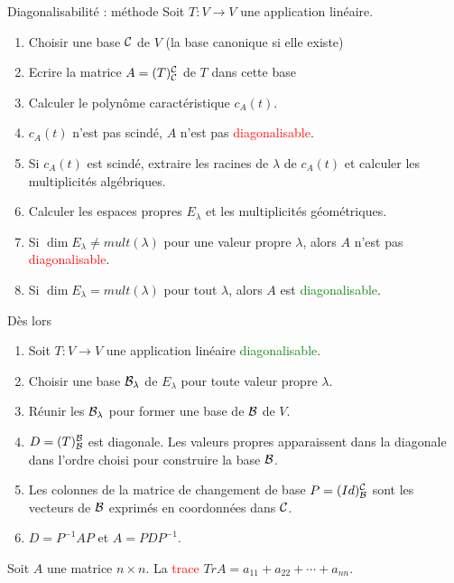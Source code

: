 \begin{parag}{Diagonalisabilité : méthode}
    Soit $T : V \to V$ une application linéaire.
    \begin{enumerate}
        \item Choisir une base $\mathcal{C}$ de $V$ (la base canonique si elle existe)
        \item Ecrire la matrice $A = (T)_{\mathcal{C}}^{\mathcal{C}}$ de $T$ dans cette base
        \item Calculer le polynôme caractéristique $c_A(t)$.
        \item $c_A(t)$ n'est pas scindé, $A$ n'est pas \textcolor{red}{diagonalisable}.
        \item Si $c_A(t)$ est scindé, extraire les racines de $\lambda$ de $c_A(t)$ et calculer les multiplicités algébriques.
        \item Calculer les espaces propres $E_\lambda$ et les multiplicités géométriques.
        \item Si $\dim E_\lambda \neq mult(\lambda)$ pour une valeur propre $\lambda$, alors $A$ n'est pas \textcolor{red}{diagonalisable}.
        \item Si $\dim E_\lambda = mult(\lambda)$ pour tout $\lambda$, alors $A$ est \textcolor{green}{diagonalisable}.
    \end{enumerate}
    Dès lors
    \begin{enumerate}
        \item Soit $T : V \to V$ une application linéaire \textcolor{green}{diagonalisable}.
        \item Choisir une base $\mathcal{B}_\lambda$ de $E_\lambda$ pour toute valeur propre $\lambda$.
        \item Réunir les $\mathcal{B}_\lambda$ pour former une base de $\mathcal{B}$ de $V$.
        \item $D = (T)_{\mathcal{B}}^{\mathcal{B}}$ est diagonale. Les valeurs propres apparaissent dans la diagonale dans l'ordre choisi pour construire la base $\mathcal{B}$.
        \item Les colonnes de la matrice de changement de base $P = (Id)_{\mathcal{B}}^{\mathcal{C}}$ sont les vecteurs de $\mathcal{B}$ exprimés en coordonnées dans $\mathcal{C}$.
        \item $D = P^{-1}AP$ et $A = PDP^{-1}$.
    \end{enumerate}
    \end{parag}
    \begin{definition}
        Soit $A$ une matrice $n \times n$. La \textcolor{red}{trace} $Tr A = a_{11} + a_{22} + \cdots + a_{nn}$.
    \end{definition}
